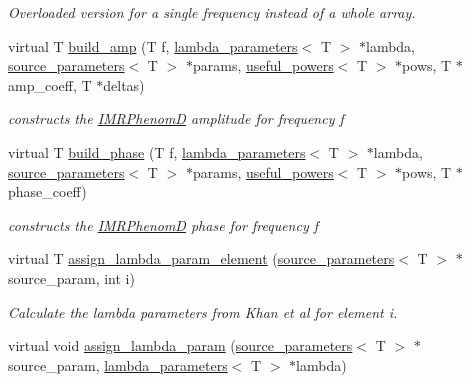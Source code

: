 \begin{DoxyCompactItemize}
\begin{DoxyCompactList}\small\item\em Overloaded version for a single frequency instead of a whole array. \end{DoxyCompactList}\item 
virtual T \hyperlink{classIMRPhenomD_acf5645dc97b020ef468149883d1aca50}{build\+\_\+amp} (T f, \hyperlink{structlambda__parameters}{lambda\+\_\+parameters}$<$ T $>$ $\ast$lambda, \hyperlink{structsource__parameters}{source\+\_\+parameters}$<$ T $>$ $\ast$params, \hyperlink{structuseful__powers}{useful\+\_\+powers}$<$ T $>$ $\ast$pows, T $\ast$amp\+\_\+coeff, T $\ast$deltas)
\begin{DoxyCompactList}\small\item\em constructs the \hyperlink{classIMRPhenomD}{I\+M\+R\+PhenomD} amplitude for frequency f \end{DoxyCompactList}\item 
virtual T \hyperlink{classIMRPhenomD_a03ecb320683b9d2b6df6e943fc55cec7}{build\+\_\+phase} (T f, \hyperlink{structlambda__parameters}{lambda\+\_\+parameters}$<$ T $>$ $\ast$lambda, \hyperlink{structsource__parameters}{source\+\_\+parameters}$<$ T $>$ $\ast$params, \hyperlink{structuseful__powers}{useful\+\_\+powers}$<$ T $>$ $\ast$pows, T $\ast$phase\+\_\+coeff)
\begin{DoxyCompactList}\small\item\em constructs the \hyperlink{classIMRPhenomD}{I\+M\+R\+PhenomD} phase for frequency f \end{DoxyCompactList}\item 
\mbox{\label{classIMRPhenomD_a551588d127597037000512cfafa42673}} 
virtual T \hyperlink{classIMRPhenomD_a551588d127597037000512cfafa42673}{assign\+\_\+lambda\+\_\+param\+\_\+element} (\hyperlink{structsource__parameters}{source\+\_\+parameters}$<$ T $>$ $\ast$source\+\_\+param, int i)
\begin{DoxyCompactList}\small\item\em Calculate the lambda parameters from Khan et al for element i. \end{DoxyCompactList}\item 
\mbox{\label{classIMRPhenomD_ae14db26ad43c3b7b4a2a962a0af5ff24}} 
virtual void \hyperlink{classIMRPhenomD_ae14db26ad43c3b7b4a2a962a0af5ff24}{assign\+\_\+lambda\+\_\+param} (\hyperlink{structsource__parameters}{source\+\_\+parameters}$<$ T $>$ $\ast$source\+\_\+param, \hyperlink{structlambda__parameters}{lambda\+\_\+parameters}$<$ T $>$ $\ast$lambda)

\end{DoxyCompactItemize}
